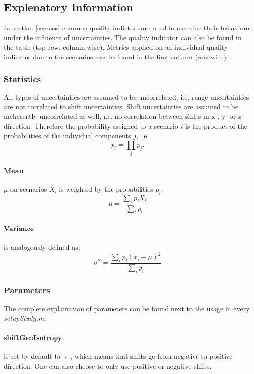 \documentclass[a4paper]{scrartcl}
\begin{document}
\subsection{Explenatory Information}
In section \ref{sec:usa} common quality indictors are used to examine their behaviour under the influence of uncertainties. 
The quality indicator can also be found in the table (top row, column-wise).
Metrics applied on an individual quality indicator due to the scenarios can be found in the first column (row-wise).

\subsubsection{Statistics}
All types of uncertainties are assumed to be uncorrelated, i.e. range uncertainties are not correlated to shift uncertainties.
Shift uncertainties are assumed to be ineherently uncorrelated as well, i.e. no correlation between shifts in x-, y- or z direction.
Therefore the probability assigned to a scenario $i$ is the product of the probabilities of the individual components $j$, i.e.
\begin{equation}
  p_i = \prod\limits_j p_j.
\end{equation}
 
\paragraph{Mean} $\mu$ on scenarios $X_i$ is weighted by the probabilities $p_i$:
\begin{equation}
  \mu = \frac{\sum\limits_{i} p_i X_i}{\sum\limits_{i} p_i}
\end{equation}
 
\paragraph{Variance} is analogously defined as:
\begin{equation}
	\sigma^2 = \frac{\sum\limits_{i} p_{i}\left(x_{i}-\mu\right)^{2}}{\sum\limits _{i}p_{i}}
\end{equation}

\subsubsection{Parameters}
The complete explaination of parameters can be found next to the usage in every \textit{setupStudy.m}.
\paragraph{shiftGenIsotropy} is set by default to \textit{+-}, which means that shifts go from negative to positive direction.
One can also choose to only use positive or negative shifts.
\end{document}
